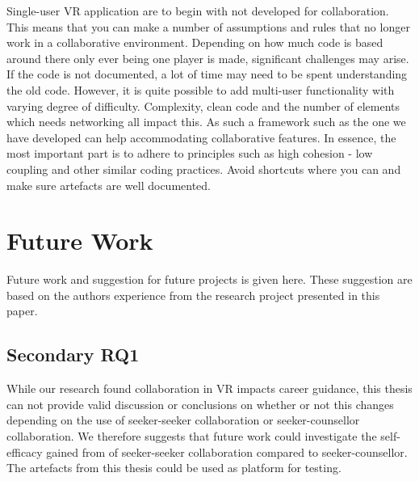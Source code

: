 Single-user VR application are to begin with not developed for collaboration. This means that you can make a number of assumptions and rules that no longer work in a collaborative environment. Depending on how much code is based around there only ever being one player is made, significant challenges may arise. If the code is not documented, a lot of time may need to be spent understanding the old code. However, it is quite possible to add multi-user functionality with varying degree of difficulty. Complexity, clean code and the number of elements which needs networking all impact this. As such a framework such as the one we have developed can help accommodating collaborative features. In essence, the most important part is to adhere to principles such as high cohesion - low coupling and other similar coding practices. Avoid shortcuts where you can and make sure artefacts are well documented.







    
    
        


    

\section{Future Work}
Future work and suggestion for future projects is given here. These suggestion are based on the authors experience from the research project presented in this paper. 

\label{section:futureWork}

\subsection{Secondary RQ1}
While our research found collaboration in VR impacts career guidance, this thesis can not provide valid discussion or conclusions on whether or not this changes depending on the use of seeker-seeker collaboration or seeker-counsellor collaboration. We therefore suggests that future work could investigate the self-efficacy gained from of seeker-seeker collaboration compared to seeker-counsellor. The artefacts from this thesis could be used as platform for testing.  

